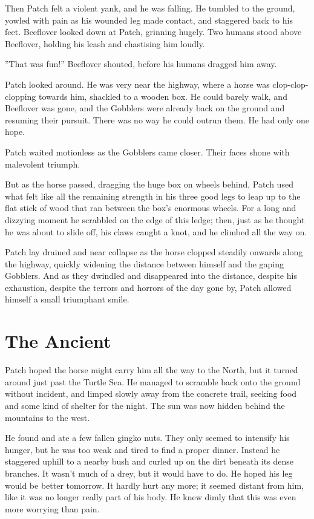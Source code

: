 \documentclass[12pt]{book}
\begin{document}
Then Patch felt a violent yank, and he was falling. He tumbled to the ground, yowled with pain as his wounded leg made contact, and staggered back to his feet. Beeflover looked down at Patch, grinning hugely. Two humans stood above Beeflover, holding his leash and chastising him loudly.

''That was fun!'' Beeflover shouted, before his humans dragged him away.

Patch looked around. He was very near the highway, where a horse was clop-clop-clopping towards him, shackled to a wooden box. He could barely walk, and Beeflover was gone, and the Gobblers were already back on the ground and resuming their pursuit. There was no way he could outrun them. He had only one hope.

Patch waited motionless as the Gobblers came closer. Their faces shone with malevolent triumph.

But as the horse passed, dragging the huge box on wheels behind, Patch used what felt like all the remaining strength in his three good legs to leap up to the flat stick of wood that ran between the box's enormous wheels. For a long and dizzying moment he scrabbled on the edge of this ledge; then, just as he thought he was about to slide off, his claws caught a knot, and he climbed all the way on.

Patch lay drained and near collapse as the horse clopped steadily onwards along the highway, quickly widening the distance between himself and the gaping Gobblers. And as they dwindled and disappeared into the distance, despite his exhaustion, despite the terrors and horrors of the day gone by, Patch allowed himself a small triumphant smile.


\section{The Ancient}

Patch hoped the horse might carry him all the way to the North, but it turned around just past the Turtle Sea. He managed to scramble back onto the ground without incident, and limped slowly away from the concrete trail, seeking food and some kind of shelter for the night. The sun was now hidden behind the mountains to the west.

He found and ate a few fallen gingko nuts. They only seemed to intensify his hunger, but he was too weak and tired to find a proper dinner. Instead he staggered uphill to a nearby bush and curled up on the dirt beneath its dense branches. It wasn't much of a drey, but it would have to do. He hoped his leg would be better tomorrow. It hardly hurt any more; it seemed distant from him, like it was no longer really part of his body. He knew dimly that this was even more worrying than pain.
\end{document}
